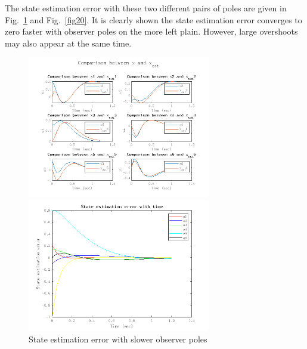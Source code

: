\documentclass[hyperref]{article}
\theoremstyle{nonumberplain}
\begin{document}
	The state estimation error with these two different pairs of poles are given in Fig.~\ref{fig19} and Fig.~\ref{fig20}. It is clearly shown the state estimation error converges to zero faster with observer poles on the more left plain. However, large overshoots may also appear at the same time. 

	\begin{figure}[H]
		\centering
		\begin{minipage}[t]{0.48\textwidth}
			\centering
			\includegraphics[width=8cm]{fig26.png}
		\end{minipage}
		\begin{minipage}[t]{0.48\textwidth}
			\centering
			\includegraphics[width=8cm]{fig27.png}
		\end{minipage}
		\caption{State estimation error with slower observer poles}
		\label{fig19}
	\end{figure}
	
\end{document}

